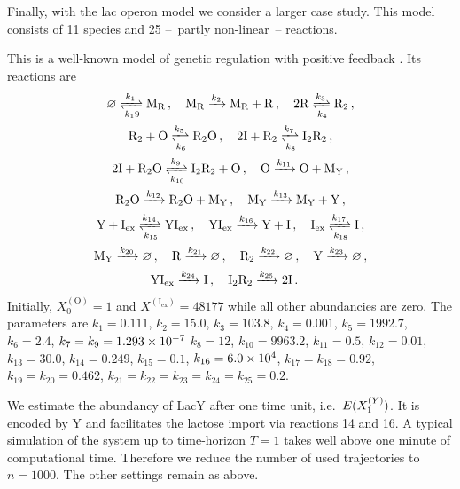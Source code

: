 Finally, with the lac operon model we consider a larger case study.
This model consists of \num{11} species and \num{25} --~partly
non-linear~-- reactions.
\begin{model}\label{model:lac}This is a well-known model
  of genetic regulation with positive feedback
  \parencite{stamatakis2009comparison}. Its reactions are
  \begin{gather*}
    \varnothing \xrightleftharpoons[k_19]{k_1} \mathrm{M_R}\,, \quad
    \mathrm{M_R} \xrightarrow{k_2} \mathrm{M_R + R}\,,\quad
    2 \mathrm{R} \xrightleftharpoons[k_4]{k_3} \mathrm{R_2}\,,\\
    \mathrm{R_2 + O} \xrightleftharpoons[k_6]{k_5}\mathrm{ R_2O}\,,\quad
    \mathrm{2 I + R_2} \xrightleftharpoons[k_8]{k_7} \mathrm{I_2R_2}\,,\\
    \mathrm{2I +R_2O} \xrightleftharpoons[k_{10}]{k_9} \mathrm{I_2R_2
    + O}\,,\quad
    \mathrm{O}\xrightarrow{k_{11}} \mathrm{O + M_Y}\,,\\
    \mathrm{R_2O}\xrightarrow{k_{12}}\mathrm{R_2O+M_Y}\,,\quad
    \mathrm{M_Y} \xrightarrow{k_{13}}\mathrm{M_Y + Y}\,,\\
    \mathrm{Y +
    I_{{ex}}}\xrightleftharpoons[k_{15}]{k_{14}}\mathrm{YI_{{ex}}}\,,\quad
    \mathrm{YI_{{ex}}}\xrightarrow{k_{16}}\mathrm{Y+I}\,,\quad
    \mathrm{I_{{ex}}}\xrightleftharpoons[k_{18}]{k_{17}}\mathrm{I}\,,\\
    \mathrm{M_Y}\xrightarrow{k_{20}}\varnothing\,,\quad
    \mathrm{R}\xrightarrow{k_{21}}\varnothing\,,\quad
    \mathrm{R_2}\xrightarrow{k_{22}}\varnothing\,,\quad
    \mathrm{Y}\xrightarrow{k_{23}}\varnothing\,,\\
    \mathrm{YI_{ex}}\xrightarrow{k_{24}}\mathrm{I}\,,\quad
    \mathrm{I_2R_2}\xrightarrow{k_{25}}\mathrm{2I}\,.\quad
  \end{gather*}
  Initially, $X^{(\mathrm{O})}_0=1$ and
  $X^{(\mathrm{I_{{ex}}})}=\num{48177}$ while all other abundancies are zero.
  The parameters are $
  k_1  = 0.111$,
  $ k_2  = 15.0$,
  $k_3  = 103.8$,
  $k_4  = \num{0.001}$,
  $k_5  = 1992.7$,
  $k_6  = 2.4$,
  $k_7 =k_9  = \num{1.293d-7}$
  $k_8  = 12$,
  $k_{10} = 9963.2$,
  $k_{11} = 0.5$,
  $k_{12} = 0.01$,
  $k_{13} = 30.0$,
  $k_{14} = 0.249$,
  $k_{15} = 0.1$,
  $k_{16} = \num{6.0d4}$,
  $k_{17} =k_{18} = 0.92$,
  $k_{19} = k_{20} = 0.462$,
  $k_{21}=k_{22}= k_{23} = k_{24} = k_{25} = 0.2$.
\end{model}
We estimate the abundancy of LacY after one time unit,
i.e.\ ${E}(X^{(Y)}_1)$.
It is encoded by Y and facilitates
the lactose import via reactions \num{14} and \num{16}.
A typical simulation of the system up to time-horizon $T=1$ takes
well above one minute of computational time.
Therefore we reduce the number of used trajectories to $n=1000$.
The other settings remain as above.


